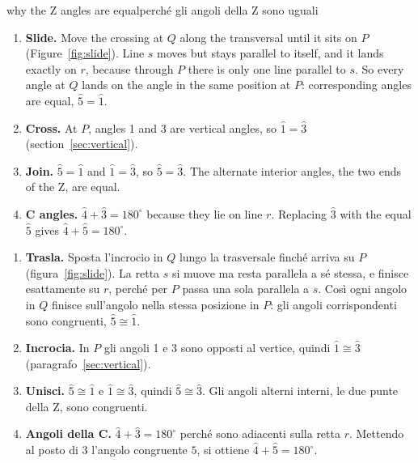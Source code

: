 \documentclass[10pt,a4paper,oneside]{book}
\newcommand{\av}[1]{\widehat{#1}}           %
\begin{document}
\begin{rebuild}{why the Z angles are equal}{perché gli angoli della Z sono uguali}
\begin{enumerate}[label=\arabic*.]
\item \textbf{Slide.} Move the crossing at $Q$ along the transversal until it sits on $P$ (Figure~\ref{fig:slide}). Line $s$ moves but stays parallel to itself, and it lands exactly on $r$, because through $P$ there is only one line parallel to $s$. So every angle at $Q$ lands on the angle in the same position at $P$: corresponding angles are equal, $\av{5} = \av{1}$.
\item \textbf{Cross.} At $P$, angles 1 and 3 are vertical angles, so $\av{1} = \av{3}$ (section~\ref{sec:vertical}).
\item \textbf{Join.} $\av{5} = \av{1}$ and $\av{1} = \av{3}$, so $\av{5} = \av{3}$. The alternate interior angles, the two ends of the Z, are equal.
\item \textbf{C angles.} $\av{4} + \av{3} = 180^\circ$ because they lie on line $r$. Replacing $\av{3}$ with the equal $\av{5}$ gives $\av{4} + \av{5} = 180^\circ$.
\end{enumerate}
\tcblower
\begin{enumerate}[label=\arabic*.]
\item \textbf{Trasla.} Sposta l'incrocio in $Q$ lungo la trasversale finché arriva su $P$ (figura~\ref{fig:slide}). La retta $s$ si muove ma resta parallela a sé stessa, e finisce esattamente su $r$, perché per $P$ passa una sola parallela a $s$. Così ogni angolo in $Q$ finisce sull'angolo nella stessa posizione in $P$: gli angoli corrispondenti sono congruenti, $\av{5} \cong \av{1}$.
\item \textbf{Incrocia.} In $P$ gli angoli 1 e 3 sono opposti al vertice, quindi $\av{1} \cong \av{3}$ (paragrafo~\ref{sec:vertical}).
\item \textbf{Unisci.} $\av{5} \cong \av{1}$ e $\av{1} \cong \av{3}$, quindi $\av{5} \cong \av{3}$. Gli angoli alterni interni, le due punte della Z, sono congruenti.
\item \textbf{Angoli della C.} $\av{4} + \av{3} = 180^\circ$ perché sono adiacenti sulla retta $r$. Mettendo al posto di $\av{3}$ l'angolo congruente $\av{5}$, si ottiene $\av{4} + \av{5} = 180^\circ$.
\end{enumerate}
\end{rebuild}
\end{document}

